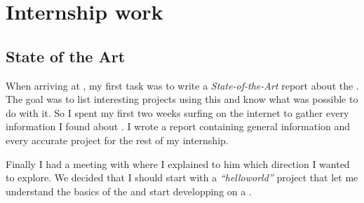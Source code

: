 
\chapter{Internship work} %

\label{Chapter2} %




\section{State of the Art}

When arriving at \groupname{}, my first task was to write a \emph{State-of-the-Art} report about the \vc{}. The goal was to list interesting projects using this  and know what was possible to do with it.
So I spent my first two weeks surfing on the internet to gather every information I found about \vc. I wrote a report containing general information and every accurate project for the rest of my internship.

Finally I had a meeting with \supname{} where I explained to him which direction I wanted to explore. We decided that I should start with a \emph{\enquote{helloworld}} project that let me understand the basics of the \vc{} and start developping on a \rasp.


